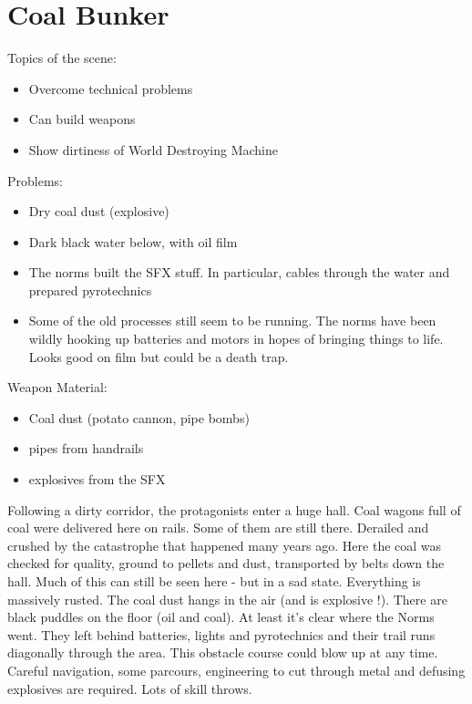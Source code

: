 \section{Coal Bunker}

Topics of the scene:
\begin{itemize}
\item Overcome technical problems
\item Can build weapons
\item Show dirtiness of World Destroying Machine
\end{itemize}

Problems:

\begin{itemize}
\item Dry coal dust (explosive)
\item Dark black water below, with oil film
\item The norms built the SFX stuff. In particular, cables through the water and prepared pyrotechnics
\item Some of the old processes still seem to be running. The norms have been wildly hooking up batteries and motors in hopes of bringing things to life. Looks good on film but could be a death trap.
\end{itemize}

Weapon Material:

\begin{itemize}
\item Coal dust (potato cannon, pipe bombs)
\item pipes from handrails
\item explosives from the SFX
\end{itemize}

Following a dirty corridor, the protagonists enter a huge hall. Coal wagons full of coal were delivered here on rails. Some of them are still there. Derailed and crushed by the catastrophe that happened many years ago. Here the coal was checked for quality, ground to pellets and dust, transported by belts down the hall. Much of this can still be seen here - but in a sad state.
Everything is massively rusted. The coal dust hangs in the air (and is explosive !). There are black puddles on the floor (oil and coal).
At least it's clear where the Norms went. They left behind batteries, lights and pyrotechnics and their trail runs diagonally through the area. This obstacle course could blow up at any time. Careful navigation, some parcours, engineering to cut through metal and defusing explosives are required. Lots of skill throws.

